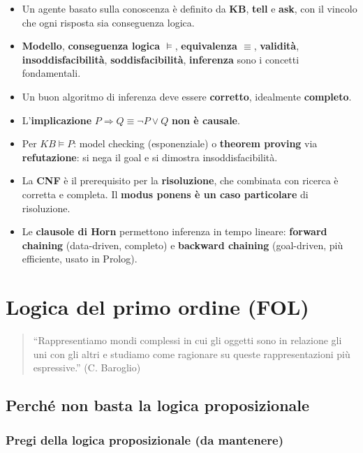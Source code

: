 \documentclass[11pt,a4paper]{report}
\begin{document}
\begin{itemize}
  \item Un agente basato sulla conoscenza è definito da \textbf{KB}, \textbf{tell} e \textbf{ask}, con il vincolo che ogni risposta sia conseguenza logica.
  \item \textbf{Modello}, \textbf{conseguenza logica $\models$}, \textbf{equivalenza $\equiv$}, \textbf{validità}, \textbf{insoddisfacibilità}, \textbf{soddisfacibilità}, \textbf{inferenza} sono i concetti fondamentali.
  \item Un buon algoritmo di inferenza deve essere \textbf{corretto}, idealmente \textbf{completo}.
  \item L'\textbf{implicazione} $P\Rightarrow Q \equiv \neg P\vee Q$ \textbf{non è causale}.
  \item Per $KB\models P$: model checking (esponenziale) o \textbf{theorem proving} via \textbf{refutazione}: si nega il goal e si dimostra insoddisfacibilità.
  \item La \textbf{CNF} è il prerequisito per la \textbf{risoluzione}, che combinata con ricerca è corretta e completa. Il \textbf{modus ponens è un caso particolare} di risoluzione.
  \item Le \textbf{clausole di Horn} permettono inferenza in tempo lineare: \textbf{forward chaining} (data-driven, completo) e \textbf{backward chaining} (goal-driven, più efficiente, usato in Prolog).
\end{itemize}

\chapter{Logica del primo ordine (FOL)}

\begin{quote}
``Rappresentiamo mondi complessi in cui gli oggetti sono in relazione gli uni con gli altri e studiamo come ragionare su queste rappresentazioni più espressive.'' (C. Baroglio)
\end{quote}

\section{Perché non basta la logica proposizionale}

\subsection*{Pregi della logica proposizionale (da mantenere)}
\end{document}
